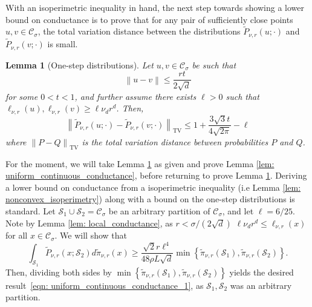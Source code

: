 \documentclass[11pt,twoside]{article}
\newtheorem{lemma}{Lemma}
\newcommand{\set}[1]{\left\{#1\right\}}
\newcommand{\norm}[1]{\left\lVert#1\right\rVert}
\newcommand{\1}{\mathbf{1}}
\newcommand{\Sset}{\mathcal{S}}
\newcommand{\Cset}{\mathcal{C}}
\newcommand{\Csig}{\Cset_{\sigma}}
\begin{document}
With an isoperimetric inequality in hand, the next step towards showing a lower bound on conductance is to prove that for any pair of sufficiently close points $u,v \in \Csig$, the total variation distance between the distributions $\widetilde{P}_{\nu,r}(u;\cdot)$ and $\widetilde{P}_{\nu,r}(v;\cdot)$ is small. 
\begin{lemma}[One-step distributions]
	\label{lem: one_step_distributions}
	Let $u,v \in \Csig$ be such that 
	\begin{equation*}
	\norm{u - v} \leq \frac{r t}{2\sqrt{d}}
	\end{equation*}
	for some $0 < t < 1$, and further assume there exists $\ell > 0$ such that $\ell_{\nu,r}(u), \ell_{\nu,r}(v) \geq \ell \nu_d r^d$. Then,
	\begin{equation*}
	\norm{\widetilde{P}_{\nu,r}(u; \cdot) - \widetilde{P}_{\nu,r}(v; \cdot)}_{\mathrm{TV}} \leq 1 + \frac{3 \sqrt{3} t}{4\sqrt{2\pi}} - \ell
	\end{equation*}
	where $\norm{P - Q}_{\mathrm{TV}}$ is the total variation distance between probabilities $P$ and $Q$. 
\end{lemma}
For the moment, we will take Lemma \ref{lem: one_step_distributions} as given and prove Lemma \ref{lem: uniform_continuous_conductance}, before returning to prove Lemma \ref{lem: one_step_distributions}. Deriving a lower bound on conductance from a isoperimetric inequality (i.e Lemma \ref{lem: nonconvex_isoperimetry}) along with a bound on the one-step distributions is standard. Let $\Sset_1 \cup \Sset_2 = \Csig$ be an arbitrary partition of $\Csig$, and let $\ell = 6/25$. Note by Lemma \ref{lem: local_conductance}, as $r < \sigma/(2\sqrt{d})$ $\ell \nu_d r^d  \leq \ell_{\nu,r}(x)$ for all $x \in \Csig$. We will show that 
\begin{equation}
\label{eqn: uniform_continuous_conductance_1}
\int_{\Sset_1} \widetilde{P}_{\nu,r}(x; \Sset_2) d \widetilde{\pi}_{\nu,r}(x) \geq \frac{\sqrt{2} r \ell^4}{48 \rho L \sqrt{d}} \min\set{\widetilde{\pi}_{\nu,r}(\Sset_1), \widetilde{\pi}_{\nu,r}(\Sset_2)}.
\end{equation}
Then, dividing both sides by $\min\set{\widetilde{\pi}_{\nu,r}(\Sset_1), \widetilde{\pi}_{\nu,r}(\Sset_2)}$ yields the desired result~\eqref{eqn: uniform_continuous_conductance_1}, as $\Sset_1,\Sset_2$ was an arbitrary partition.
\end{document}
